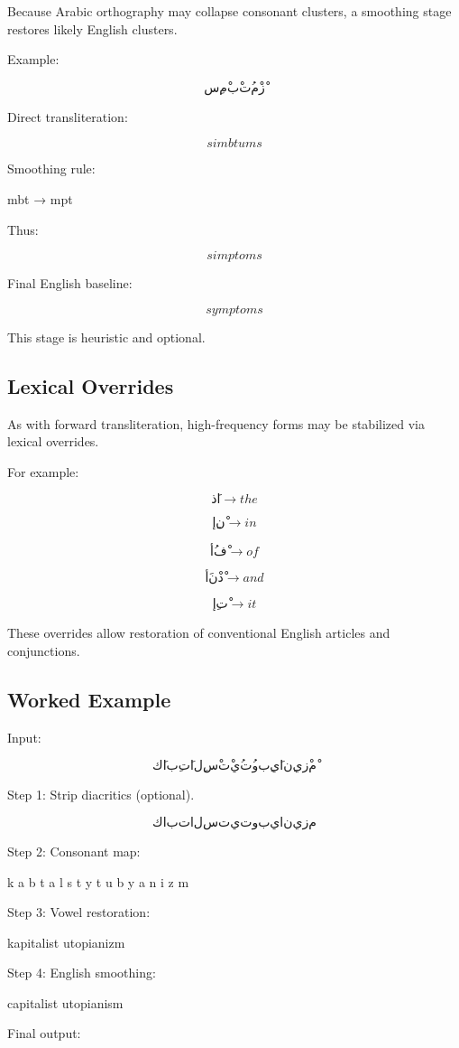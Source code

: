 \documentclass[12pt]{article}
\begin{document}
Because Arabic orthography may collapse consonant clusters, a smoothing stage restores likely English clusters.

Example:

\[
سِمْبْتُمْزْ
\]

Direct transliteration:

\[
simbtums
\]

Smoothing rule:

mbt → mpt

Thus:

\[
simptoms
\]

Final English baseline:

\[
symptoms
\]

This stage is heuristic and optional.

\subsection{Lexical Overrides}

As with forward transliteration, high-frequency forms may be stabilized via lexical overrides.

For example:

\[
ذَا \rightarrow the
\]

\[
إِنْ \rightarrow in
\]

\[
أُفْ \rightarrow of
\]

\[
أَنْدْ \rightarrow and
\]

\[
إِتْ \rightarrow it
\]

These overrides allow restoration of conventional English articles and conjunctions.

\subsection{Worked Example}

Input:

\[
كَابِتَالِسْتْ يُتُوبِيَانِيزْمْ
\]

Step 1: Strip diacritics (optional).

\[
كابتالست يتوبيانيزم
\]

Step 2: Consonant map:

k a b t a l s t y t u b y a n i z m

Step 3: Vowel restoration:

kapitalist utopianizm

Step 4: English smoothing:

capitalist utopianism

Final output:
\end{document}
